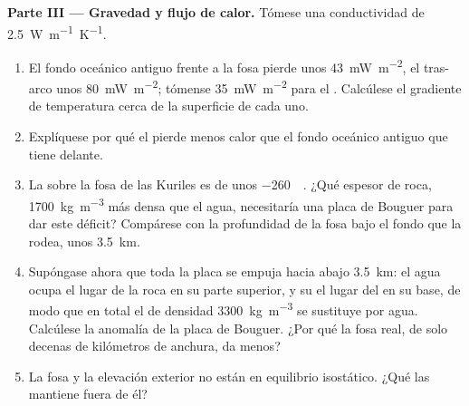 \begin{problem}
\medskip
\noindent\textbf{Parte III --- Gravedad y flujo de calor.} Tómese una conductividad de
\qty{2.5}{W.m^{-1}.K^{-1}}.
\begin{enumerate}[resume]
  \item El fondo oceánico antiguo frente a la fosa pierde unos \qty{43}{mW.m^{-2}}, el tras-arco unos \qty{80}{mW.m^{-2}}; tómense
        \qty{35}{mW.m^{-2}} para el . Calcúlese el gradiente de temperatura cerca de la superficie de cada uno.
  \item Explíquese por qué el  pierde menos calor que el fondo oceánico antiguo que tiene delante.
  \item La  sobre la fosa de las Kuriles es de unos \qty{-260}{\milli\gal}. ¿Qué espesor de roca, \qty{1700}{kg.m^{-3}} más
        densa que el agua, necesitaría una placa de Bouguer para dar este déficit? Compárese con la profundidad de la fosa bajo el fondo que la
        rodea, unos \qty{3.5}{km}.
  \item Supóngase ahora que toda la placa se empuja hacia abajo \qty{3.5}{km}: el agua ocupa el lugar de la roca en su parte superior, y su 
        el lugar del  en su base, de modo que en total el  de densidad \qty{3300}{kg.m^{-3}} se sustituye por agua. Calcúlese la anomalía de la
        placa de Bouguer. ¿Por qué la fosa real, de solo decenas de kilómetros de anchura, da menos?
  \item La fosa y la elevación exterior no están en equilibrio isostático. ¿Qué las mantiene fuera de él?
\end{enumerate}


\end{problem}
